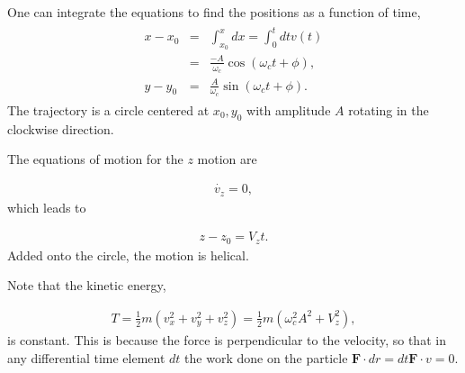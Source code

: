 \documentclass[letterpaper,10pt,english]{sphinxmanual}
\begin{document}
One can integrate the equations to find the positions as a function of time,
\begin{equation*}
\begin{split}
\begin{eqnarray}
x-x_0&=&\int_{x_0}^x dx=\int_0^t dt v(t)\\
\nonumber
&=&\frac{-A}{\omega_c}\cos(\omega_ct+\phi),\\
\nonumber
y-y_0&=&\frac{A}{\omega_c}\sin(\omega_ct+\phi).
\end{eqnarray}
\end{split}
\end{equation*}
The trajectory is a circle centered at \(x_0,y_0\) with amplitude \(A\) rotating in the clockwise direction.

The equations of motion for the \(z\) motion are




\begin{equation*}
\begin{split}
\begin{equation}
\dot{v_z}=0,
\label{_auto16} \tag{16}
\end{equation}
\end{split}
\end{equation*}
which leads to




\begin{equation*}
\begin{split}
\begin{equation}
z-z_0=V_zt.
\label{_auto17} \tag{17}
\end{equation}
\end{split}
\end{equation*}
Added onto the circle, the motion is helical.

Note that the kinetic energy,




\begin{equation*}
\begin{split}
\begin{equation}
T=\frac{1}{2}m(v_x^2+v_y^2+v_z^2)=\frac{1}{2}m(\omega_c^2A^2+V_z^2),
\label{_auto18} \tag{18}
\end{equation}
\end{split}
\end{equation*}
is constant. This is because the force is perpendicular to the
velocity, so that in any differential time element \(dt\) the work done
on the particle \(\boldsymbol{F}\cdot{dr}=dt\boldsymbol{F}\cdot{v}=0\).
\end{document}
